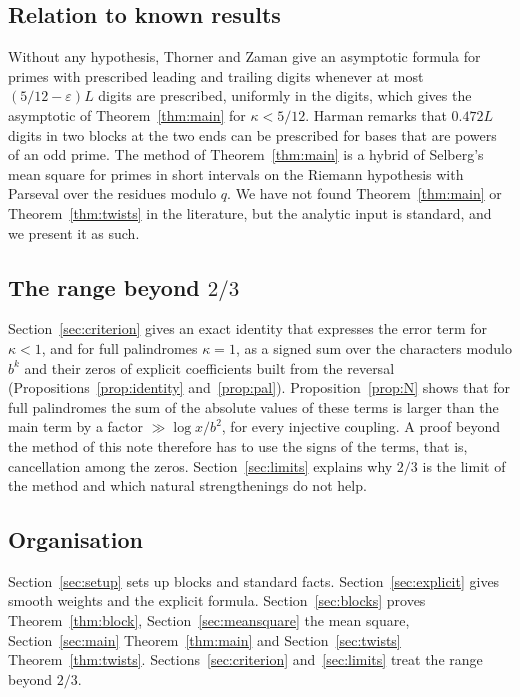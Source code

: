 \documentclass[11pt]{amsart}
\theoremstyle{definition}
\numberwithin{equation}{section}
\begin{document}
\subsection{Relation to known results}
Without any hypothesis, Thorner and Zaman \cite[Cor.~3.2]{TZ} give an asymptotic formula for primes with prescribed leading and trailing digits whenever at most $(5/12-\varepsilon)L$ digits are prescribed, uniformly in the digits, which gives the asymptotic of Theorem~\ref{thm:main} for $\kappa<5/12$. Harman \cite{Har06} remarks that $0.472L$ digits in two blocks at the two ends can be prescribed for bases that are powers of an odd prime. The method of Theorem~\ref{thm:main} is a hybrid of Selberg's mean square for primes in short intervals on the Riemann hypothesis \cite{Sel43} with Parseval over the residues modulo $q$. We have not found Theorem~\ref{thm:main} or Theorem~\ref{thm:twists} in the literature, but the analytic input is standard, and we present it as such.

\subsection{\texorpdfstring{The range beyond $2/3$}{The range beyond 2/3}}
Section~\ref{sec:criterion} gives an exact identity that expresses the error term for $\kappa<1$, and for full palindromes $\kappa=1$, as a signed sum over the characters modulo $b^k$ and their zeros of explicit coefficients built from the reversal (Propositions~\ref{prop:identity} and~\ref{prop:pal}). Proposition~\ref{prop:N} shows that for full palindromes the sum of the absolute values of these terms is larger than the main term by a factor $\gg\log x/b^2$, for every injective coupling. A proof beyond the method of this note therefore has to use the signs of the terms, that is, cancellation among the zeros. Section~\ref{sec:limits} explains why $2/3$ is the limit of the method and which natural strengthenings do not help.

\subsection{Organisation}
Section~\ref{sec:setup} sets up blocks and standard facts. Section~\ref{sec:explicit} gives smooth weights and the explicit formula. Section~\ref{sec:blocks} proves Theorem~\ref{thm:block}, Section~\ref{sec:meansquare} the mean square, Section~\ref{sec:main} Theorem~\ref{thm:main} and Section~\ref{sec:twists} Theorem~\ref{thm:twists}. Sections~\ref{sec:criterion} and~\ref{sec:limits} treat the range beyond $2/3$.
\end{document}
